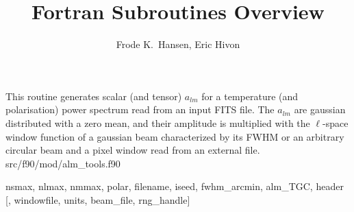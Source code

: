 
\sloppy


\title{\healpix Fortran Subroutines Overview}
 \section[create\_alm*]{ }
\label{sub:create_alm}
\author{Frode K.~Hansen, Eric Hivon}

\begin{facility}
{This routine generates scalar (and tensor) $a_{lm}$ for a temperature (and
  polarisation) power spectrum read from an input FITS
file. The $a_{lm}$ are gaussian distributed with a zero mean, and their
  amplitude is multiplied with the $\ell$-space window function of a gaussian
  beam characterized by its FWHM or an arbitrary circular beam
and a pixel window read from an external file.}
{src/f90/mod/alm\_tools.f90}
\end{facility}

\begin{f90format}
{nsmax, nlmax, nmmax, polar, filename, iseed, fwhm\_arcmin, alm\_TGC, header [,
windowfile, units, beam\_file, rng\_handle]}
\end{f90format}

